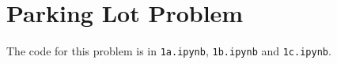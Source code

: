 \section{Parking Lot Problem}
The code for this problem is in \texttt{1a.ipynb}, \texttt{1b.ipynb} and \texttt{1c.ipynb}.
